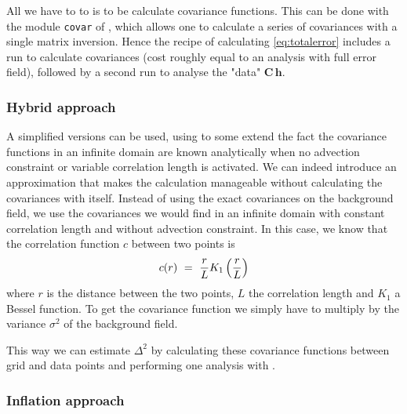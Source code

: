 All we have to to is to be calculate covariance functions. This can be done with the module {\tt covar} of \diva, which allows one to calculate
a series of covariances with a single matrix inversion. Hence the recipe of calculating \eqref{eq:totalerror} includes a \diva run to calculate covariances (cost roughly equal to an analysis with full error field), followed by a second \diva run to analyse the "data" $\mathbf{C}  \, \mathbf{h}$.



\subsubsection{Hybrid approach}

A simplified versions can be used, using to some extend the fact the covariance functions in an infinite domain are known analytically when no
advection constraint or variable correlation length is activated. We can indeed introduce an approximation that makes the calculation manageable without calculating the covariances with \diva itself. Instead of using the exact covariances on the background field, we use the covariances we would find in an infinite domain with constant correlation length and without advection constraint. In this case, we know
that the correlation function $c$ between two points is
\begin{equation}
c(r) ~=~{r \over L} K_1 \left(r \over L\right)
\end{equation}
where $r$ is the distance between the two points, $L$ the correlation length and $K_1$ a Bessel function. To get the covariance function we simply have to multiply by the variance $\sigma^2$ of the background field.

This way we can estimate $\Delta^2$ by calculating these covariance functions between grid and data points and performing one analysis with \diva.

\subsubsection{Inflation approach}


